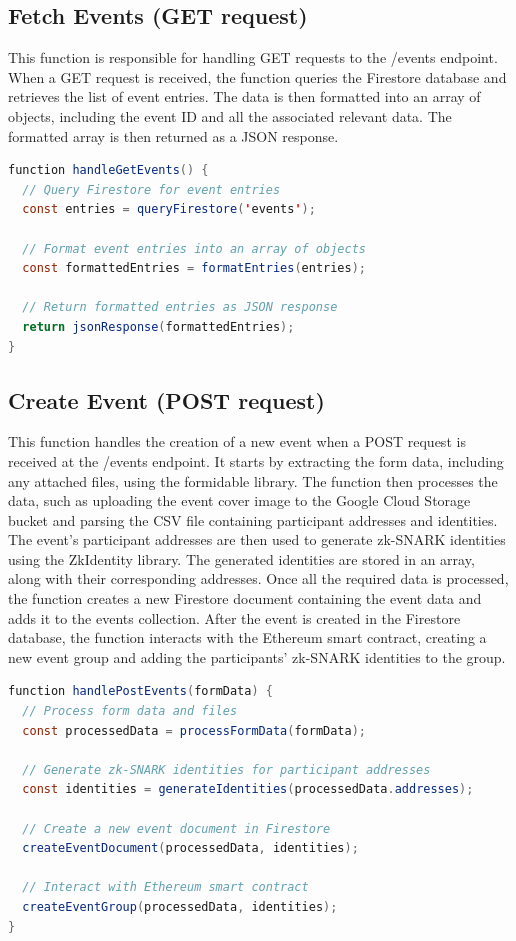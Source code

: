 \subsection{Fetch Events (GET request)}
This function is responsible for handling GET requests to the /events endpoint. When a GET request is received, the function queries the Firestore database and retrieves the list of event entries. The data is then formatted into an array of objects, including the event ID and all the associated relevant data. The formatted array is then returned as a JSON response.

\begin{lstlisting}[language=Java, name={Fetch Events Function}, label={sc:fetchEvents}]
function handleGetEvents() {
  // Query Firestore for event entries
  const entries = queryFirestore('events');

  // Format event entries into an array of objects
  const formattedEntries = formatEntries(entries);

  // Return formatted entries as JSON response
  return jsonResponse(formattedEntries);
}
\end{lstlisting}

\subsection{Create Event (POST request)}
This function handles the creation of a new event when a POST request is received at the /events endpoint. It starts by extracting the form data, including any attached files, using the formidable library. The function then processes the data, such as uploading the event cover image to the Google Cloud Storage bucket and parsing the CSV file containing participant addresses and identities.
The event's participant addresses are then used to generate zk-SNARK identities using the ZkIdentity library. The generated identities are stored in an array, along with their corresponding addresses. Once all the required data is processed, the function creates a new Firestore document containing the event data and adds it to the events collection.
After the event is created in the Firestore database, the function interacts with the Ethereum smart contract, creating a new event group and adding the participants' zk-SNARK identities to the group.

\begin{lstlisting}[language=Java, name={Create Event Function}, label={sc:createEvent}]
function handlePostEvents(formData) {
  // Process form data and files
  const processedData = processFormData(formData);

  // Generate zk-SNARK identities for participant addresses
  const identities = generateIdentities(processedData.addresses);

  // Create a new event document in Firestore
  createEventDocument(processedData, identities);

  // Interact with Ethereum smart contract
  createEventGroup(processedData, identities);
}
\end{lstlisting}

